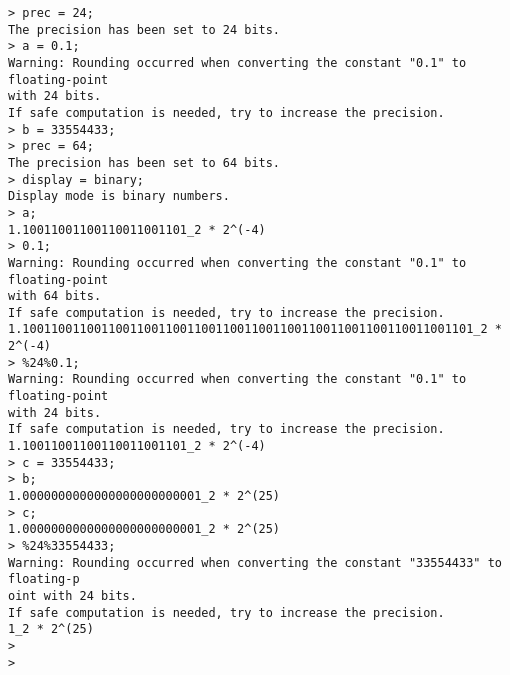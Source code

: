 \begin{center}\begin{minipage}{15cm}\begin{Verbatim}[frame=single]
> prec = 24;
The precision has been set to 24 bits.
> a = 0.1;
Warning: Rounding occurred when converting the constant "0.1" to floating-point 
with 24 bits.
If safe computation is needed, try to increase the precision.
> b = 33554433;
> prec = 64;
The precision has been set to 64 bits.
> display = binary;
Display mode is binary numbers.
> a;
1.10011001100110011001101_2 * 2^(-4)
> 0.1;
Warning: Rounding occurred when converting the constant "0.1" to floating-point 
with 64 bits.
If safe computation is needed, try to increase the precision.
1.100110011001100110011001100110011001100110011001100110011001101_2 * 2^(-4)
> %24%0.1;
Warning: Rounding occurred when converting the constant "0.1" to floating-point 
with 24 bits.
If safe computation is needed, try to increase the precision.
1.10011001100110011001101_2 * 2^(-4)
> c = 33554433;
> b;
1.0000000000000000000000001_2 * 2^(25)
> c;
1.0000000000000000000000001_2 * 2^(25)
> %24%33554433;
Warning: Rounding occurred when converting the constant "33554433" to floating-p
oint with 24 bits.
If safe computation is needed, try to increase the precision.
1_2 * 2^(25)
> 
> 
\end{Verbatim}
\end{minipage}\end{center}
